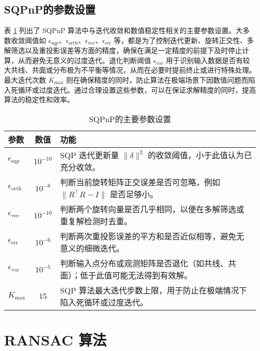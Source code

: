 \subsection{SQPnP的参数设置}
表 \ref{tab:sqpnp-params} 列出了 SQPnP 算法中与迭代收敛和数值稳定性相关的主要参数设置。大多数收敛阈值如 \(\epsilon_{\mathrm{sqp}}\)、\(\epsilon_{\mathrm{orth}}\)、\(\epsilon_{\mathrm{vec}}\)、\(\epsilon_{\mathrm{err}}\) 等，都是为了控制迭代更新、旋转正交性、多解筛选以及重投影误差等方面的精度，确保在满足一定精度的前提下及时停止计算，从而避免无意义的过度迭代。退化判断阈值 \(\epsilon_{\mathrm{var}}\) 用于识别输入数据是否有较大共线、共面或分布极为不平衡等情况，从而在必要时提前终止或进行特殊处理。最大迭代次数 \(K_{\mathrm{max}}\) 则在确保精度的同时，防止算法在极端场景下因数值问题而陷入死循环或过度迭代。通过合理设置这些参数，可以在保证求解精度的同时，提高算法的稳定性和效率。
\begin{table}[htbp]
	\centering
	\caption{SQPnP的主要参数设置}
	\label{tab:sqpnp-params}
	\begin{tabular}{l c p{7.5cm}}
		\toprule
		\textbf{参数} & \textbf{数值} & \textbf{功能} \\
		\midrule
		
		$\epsilon_{\mathrm{sqp}}$      & $10^{-10}$ & 
		SQP 迭代更新量 $\|\delta\|^2$ 的收敛阈值，小于此值认为已充分收敛。\\[3pt]
		
		$\epsilon_{\mathrm{orth}}$     & $10^{-8}$  & 
		判断当前旋转矩阵正交误差是否可忽略，例如 $\|R^\top R - I\|$ 是否足够小。\\[3pt]
		
		$\epsilon_{\mathrm{vec}}$      & $10^{-10}$ &
		判断两个旋转向量是否几乎相同，以便在多解筛选或重复解检测时去重。\\[3pt]
		
		$\epsilon_{\mathrm{err}}$      & $10^{-6}$  &
		判断两次重投影误差的平方和是否近似相等，避免无意义的细微迭代。\\[3pt]
		
		$\epsilon_{\mathrm{var}}$      & $10^{-5}$  &
		判断输入点分布或观测矩阵是否退化（如共线、共面）；低于此值可能无法得到有效解。\\[3pt]
		
		$K_{\mathrm{max}}$             & 15         &
		SQP 算法最大迭代步数上限，用于防止在极端情况下陷入死循环或过度迭代。\\
		\bottomrule
	\end{tabular}
\end{table}

\section{RANSAC 算法}
\label{sec:RANSAC-TRO-SQPnP:RANSAC}

